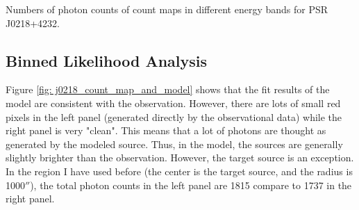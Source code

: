 \documentclass[a4paper, 12pt]{report}
\newcommand{\mycaption}[1]{\protect \caption{#1}}
\begin{document}
      \begin{table}[!htp]   
        \centering
        \mycaption{Numbers of photon counts of count maps in different energy bands for 
              PSR J0218+4232.}
        \label{table:j0218_ccube_photon_counts}
      \end{table}

    \subsection{Binned Likelihood Analysis}
      Figure \ref{fig: j0218_count_map_and_model} shows that the fit results of the model 
      are consistent with the observation. However, there are lots of small red pixels 
      in the left panel (generated directly by the observational data) while the 
      right panel is very "clean". This means that a lot of photons are thought as 
      generated by the modeled source. Thus, in the model, the sources are generally 
      slightly brighter than the observation. However, the target
      source is an exception. In the region I have used before (the center is the 
      target source, and the radius is 1000$''$), the total photon counts in the left 
      panel are 1815 compare to 1737 in the right panel. 
\end{document}
